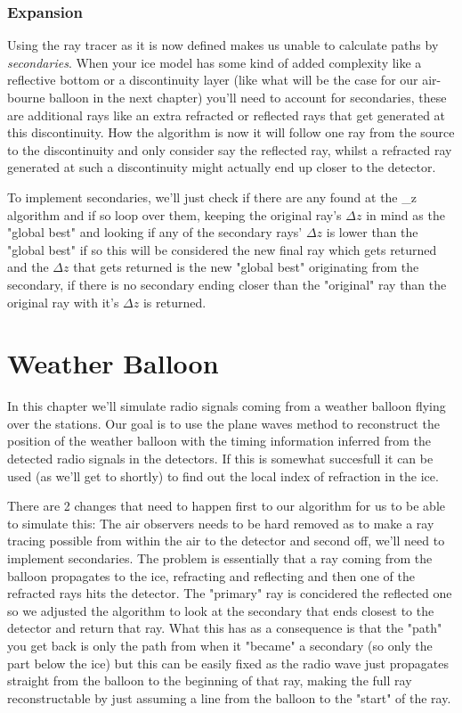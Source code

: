 \documentclass[11pt,a4paper,faculty=we,language=en,doctype=report]{cls/ugent-doc}
\begin{document}
\subsection{Expansion}
Using the ray tracer as it is now defined makes us unable to calculate paths by \textit{secondaries}.
When your ice model has some kind of added complexity like a reflective bottom or a discontinuity layer 
(like what will be the case for our air-bourne balloon in the next chapter)
you'll need to account for secondaries, these are additional rays like an extra refracted or reflected rays that get generated at this discontinuity. How the algorithm is now it will follow one ray from the source to the discontinuity and 
only consider say the reflected ray, whilst a refracted ray generated at such a discontinuity might actually end
up closer to the detector.

To implement secondaries, we'll just check if there are any found at the \delta\_z algorithm and if so loop over them,
keeping the original ray's $\Delta z$ in mind as the "global best" and looking if any of the secondary rays' $\Delta z$ is 
lower than the "global best" if so this will be considered the new final ray which gets returned and the $\Delta z$ that
gets returned is the new "global best" originating from the secondary, if there is no secondary ending closer than the "original" ray than the original ray with it's $\Delta z$ is returned.

\chapter{Weather Balloon}
\label{chap:WB}
In this chapter we'll simulate radio signals coming from a weather
balloon flying over the stations. Our goal is to use the plane waves 
method to reconstruct the position of the weather balloon with the
timing information inferred from the detected radio signals in the
detectors.
If this is somewhat succesfull it can be used (as we'll get to
shortly) to find out the local index of refraction in the ice.

There are 2 changes that need to happen first to our algorithm for us to
be able to simulate this: The air observers needs to be hard removed
as to make a ray tracing possible from within the air to the
detector and second off, we'll need to implement secondaries.
The problem is essentially that a ray coming from the balloon 
propagates to the ice, refracting and reflecting and then one 
of the refracted rays hits the detector. 
The "primary" ray is concidered the reflected one 
so we adjusted the algorithm to look at the secondary that ends
closest to the detector and return that ray. What this has as
a consequence is that the "path" you get back is only the path
from when it "became" a secondary (so only the part below the ice)
but this can be easily fixed as the radio wave just propagates
straight from the balloon to the beginning of that ray,  making 
the full ray reconstructable by just assuming a line from the 
balloon to the "start" of the ray.
\end{document}
